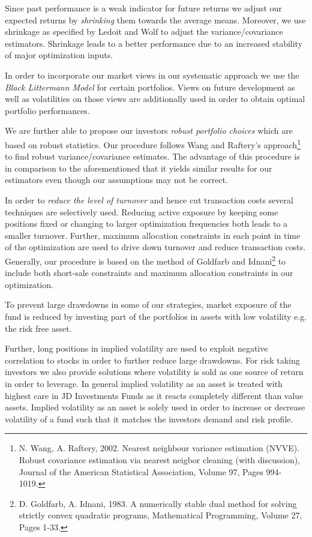 \documentclass[11pt, parskip=full, DIV=14]{scrreprt}
\begin{document}
Since past performance is a weak indicator for future returns we adjust our expected returns by \textit{shrinking} them towards the average means.
Moreover, we use shrinkage as specified by Ledoit and Wolf to adjust the variance/covariance estimators.
Shrinkage leads to a better performance due to an increased stability of major optimization inputs.

In order to incorporate our market views in our systematic approach we use the \textit{Black Littermann Model} for certain portfolios.
Views on future development as well as volatilities on those views are additionally used in order to obtain optimal portfolio performances.

We are further able to propose our investors \textit{robust portfolio choices} which are based on robust statistics.
Our procedure follows Wang and Raftery’s approach\footnote{N. Wang, A. Raftery, 2002. Nearest neighbour variance estimation (NVVE). Robust covariance estimation via nearest neigbor cleaning (with discussion), Journal of the American Statistical Association, Volume 97, Pages 994-1019.} to find robust variance/covariance estimates.
The advantage of this procedure is in comparison to the aforementioned that it yields similar results for our estimators even though our assumptions may not be correct.

In order to \textit{reduce the level of turnover} and hence cut transaction costs several techniques are selectively used.
Reducing active exposure by keeping some positions fixed or changing to larger optimization frequencies both leads to a smaller turnover.
Further, maximum allocation constraints in each point in time of the optimization are used to drive down turnover and reduce transaction costs.
Generally, our procedure is based on the method of Goldfarb and Idnani\footnote{D. Goldfarb, A. Idnani, 1983. A numerically stable dual method for solving strictly convex quadratic programs, Mathematical Programming, Volume 27, Pages 1-33.} to include both short-sale constraints and maximum allocation constraints in our optimization.

To prevent large drawdowns in some of our strategies, market exposure of the fund is reduced by investing part of the portfolios in assets with low volatility e.g. the risk free asset.

Further, long positions in implied volatility are used to exploit negative correlation to stocks in order to further reduce large drawdowns.
For risk taking investors we also provide solutions where volatility is sold as one source of return in order to leverage.
In general implied volatility as an asset is treated with highest care in JD Investments Funds as it reacts completely different than value assets.
Implied volatility as an asset is solely used in order to increase or decrease volatility of a fund such that it matches the investors demand and risk profile.
\end{document}
